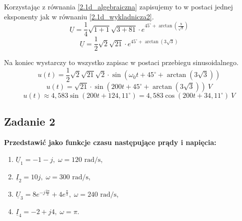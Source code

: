 \documentclass[12pt, a4paper]{article}
\begin{document}
\begin{enumerate}[label=\alph*)]
        Korzystając z równania \ref{2.1d_algebraiczna} zapisujemy to w postaci
        jednej eksponenty jak w równaniu \ref{2.1d_wykladnicza2}.
        $$
          \underline{U} = \frac{1}{4}\sqrt{1+1}\sqrt{3+81} \cdot
          e^{45^\circ+\arctan\left(\frac{9}{\sqrt{3}}\right)}
        $$
        \begin{equation}\label{2.1d_wykladnicza2}
          \underline{U} = \frac{1}{2}\sqrt{2}\sqrt{21}\cdot
          e^{45^\circ+\arctan\left(3\sqrt{3}\right)}
        \end{equation}

        Na koniec wystarczy to wszystko zapisac w postaci przebiegu sinusoidalnego.
        $$
          u(t) = \frac{1}{2}\sqrt{2}\sqrt{21}\sqrt{2}\cdot
          \sin\left(\omega_0 t+45^\circ+\arctan\left(3\sqrt{3}\right)\right)
        $$
        $$
          u(t) = \sqrt{21}\cdot
          \sin\left(200t+45^\circ+\arctan\left(3\sqrt{3}\right)\right)\: V
        $$
        $$
          u(t) \approx 4,583 \sin\left(200t+124,11^\circ\right) =
          4,583 \cos\left(200t+34,11^\circ\right)\: V
        $$
\end{enumerate}

\subsection{Zadanie 2}
\textbf{Przedstawić jako funkcje czasu następujące prądy i napięcia:}
\begin{enumerate}[label=\alph*)]
  \item $\underline{U}_1 = -1-j, \; \omega = 120\textrm{ rad/s}$,
  \item $\underline{I}_2 = 10j, \; \omega = 300\textrm{ rad/s}$,
  \item $\underline{U}_3 = 8e^{-j\frac{2\pi}{3}}+4e^{\frac{\pi}{3}},\;
          \omega = 240\textrm{ rad/s}$,
  \item $\underline{I}_4 = -2+j4, \; \omega = \pi$.
\end{enumerate}
\end{document}

